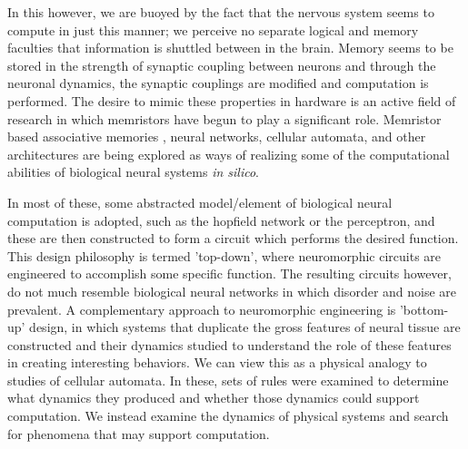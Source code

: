 \documentclass[aps,prl,preprint,groupedaddress]{revtex4-1}
\begin{document}
In this however, we are buoyed by the fact that the nervous system seems to
compute in just this manner; we perceive no separate logical and memory
faculties that information is shuttled between in the brain.  Memory seems
to be stored
in the strength of synaptic coupling between neurons and through the neuronal
dynamics, the synaptic couplings are modified and computation is performed.
The desire to mimic these properties in hardware is an active field of
research in which memristors have begun to play a significant role.  
Memristor based associative memories \cite{Pershin2010, Eryilmaz2014},
 neural networks, cellular automata,
and other architectures are being explored as ways of realizing some
of the computational abilities of biological neural systems
\textit{in silico}.

In most of these, some abstracted model/element of
biological neural computation is adopted, such as the hopfield network or the
perceptron, and these are then constructed to form a circuit which
performs the desired function.  This design philosophy is termed 'top-down',
where neuromorphic circuits are engineered to accomplish some specific 
function.  The resulting circuits however, do not
much resemble biological neural networks in which disorder and noise are
prevalent.  A complementary approach to neuromorphic engineering is 'bottom-up'
design, in which systems that duplicate the gross features of neural tissue
are constructed and their dynamics studied to understand the role of these
features in creating interesting behaviors.  We can view this as a physical
analogy to studies of cellular automata. In these, sets of rules were examined
to determine what dynamics they produced and whether those dynamics could
support computation.\cite{Langton1990}  We instead examine the dynamics of
physical systems and search for phenomena that may support computation.
\end{document}
